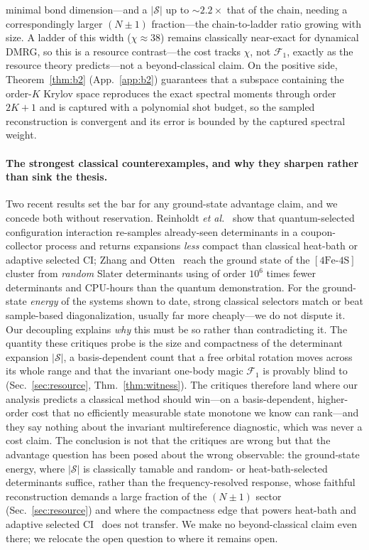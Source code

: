 minimal bond dimension---and a $|\mathcal S|$ up to $\sim\!2.2\times$ that of the chain, needing a
correspondingly larger $(N{\pm}1)$ fraction---the chain-to-ladder ratio growing with size. A ladder of this
width ($\chi\!\approx\!38$) remains classically near-exact for dynamical DMRG, so this is a resource
contrast---the cost tracks $\chi$, not $\mathcal F_1$, exactly as the resource theory predicts---not a
beyond-classical claim. On the positive side,
Theorem~\ref{thm:b2} (App.~\ref{app:b2}) guarantees that a subspace containing the order-$K$ Krylov
space reproduces the exact spectral moments through order $2K{+}1$ and is captured with a polynomial
shot budget, so the sampled reconstruction is convergent and its error is bounded by the captured
spectral weight.

\paragraph{The strongest classical counterexamples, and why they sharpen rather than sink the thesis.}
Two recent results set the bar for any ground-state advantage claim, and we concede both without
reservation. Reinholdt \emph{et al.}~\cite{reinholdt2025} show that quantum-selected configuration
interaction re-samples already-seen determinants in a coupon-collector process and returns expansions
\emph{less} compact than classical heat-bath or adaptive selected CI; Zhang and
Otten~\cite{zhangotten2026} reach the ground state of the $[\mathrm{4Fe\text{-}4S}]$ cluster from
\emph{random} Slater determinants using of order $10^{6}$ times fewer determinants and CPU-hours than the
quantum demonstration. For the ground-state \emph{energy} of the systems shown to date, strong classical
selectors match or beat sample-based diagonalization, usually far more cheaply---we do not dispute it.
Our decoupling explains \emph{why} this must be so rather than contradicting it. The quantity these
critiques probe is the size and compactness of the determinant expansion $|\mathcal S|$, a
basis-dependent count that a free orbital rotation moves across its whole range and that the invariant
one-body magic $\mathcal F_1$ is provably blind to (Sec.~\ref{sec:resource}, Thm.~\ref{thm:witness}). The
critiques therefore land where our analysis predicts a classical method should win---on a
basis-dependent, higher-order cost that no efficiently measurable state monotone we know can rank---and
they say nothing about the invariant multireference diagnostic, which was never a cost claim. The
conclusion is not that the critiques are wrong but that the advantage question has been posed about the
wrong observable: the ground-state energy, where $|\mathcal S|$ is classically tamable and random- or
heat-bath-selected determinants suffice, rather than the frequency-resolved response, whose faithful
reconstruction demands a large fraction of the $(N\pm1)$ sector (Sec.~\ref{sec:resource}) and where the
compactness edge that powers heat-bath and adaptive selected CI~\cite{holmeshci2016,sharmashci2017,tubmanasci2016} does not transfer. We make no beyond-classical claim
even there; we relocate the open question to where it remains open.

